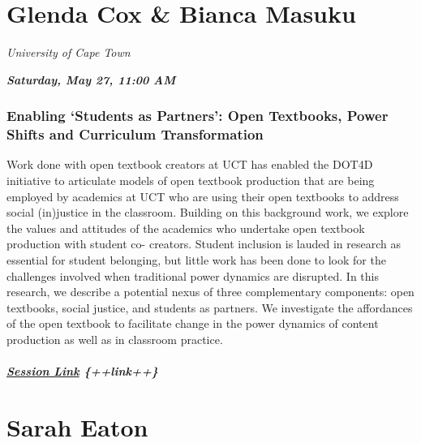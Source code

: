 \documentclass[
]{book}
\begin{document}
\hypertarget{glenda-cox-bianca-masuku}{%
\section*{Glenda Cox \& Bianca Masuku}\label{glenda-cox-bianca-masuku}}

\emph{University of Cape Town}

\textbf{\emph{Saturday, May 27, 11:00 AM}}

\begin{keynote}
\hypertarget{enabling-students-as-partners-open-textbooks-power-shifts-and-curriculum-transformation}{%
\subsubsection*{Enabling `Students as Partners': Open Textbooks, Power
Shifts and Curriculum
Transformation}\label{enabling-students-as-partners-open-textbooks-power-shifts-and-curriculum-transformation}}

Work done with open textbook creators at UCT has enabled the DOT4D
initiative to articulate models of open textbook production that are
being employed by academics at UCT who are using their open textbooks to
address social (in)justice in the classroom. Building on this background
work, we explore the values and attitudes of the academics who undertake
open textbook production with student co- creators. Student inclusion is
lauded in research as essential for student belonging, but little work
has been done to look for the challenges involved when traditional power
dynamics are disrupted. In this research, we describe a potential nexus
of three complementary components: open textbooks, social justice, and
students as partners. We investigate the affordances of the open
textbook to facilitate change in the power dynamics of content
production as well as in classroom practice.

\hypertarget{session-link-link}{%
\subparagraph{\texorpdfstring{\href{}{Session Link}
\{++link++\}}{Session Link \{++link++\}}}\label{session-link-link}}
\end{keynote}

\hypertarget{sarah-eaton}{%
\section*{Sarah Eaton}\label{sarah-eaton}}
\end{document}
